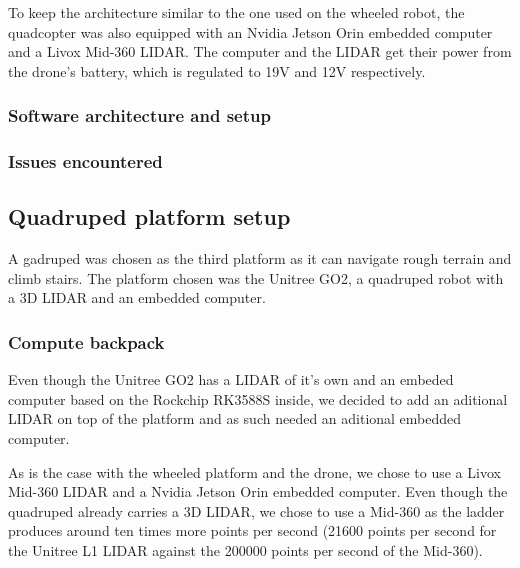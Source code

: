 \documentclass[11pt]{article}
\begin{document}
                To keep the architecture similar to the one used on the wheeled robot, the quadcopter was also equipped with an Nvidia Jetson Orin embedded computer and a Livox Mid-360 LIDAR. The computer and the LIDAR get their power from the drone's battery, which is regulated to 19V and 12V respectively.

            \subsubsection{Software architecture and setup}
                
        
            \subsubsection{Issues encountered}
            
    \subsection{Quadruped platform setup}

        A gadruped was chosen as the third platform as it can navigate rough terrain and climb stairs. The platform chosen was the Unitree GO2, a quadruped robot with a 3D LIDAR and an embedded computer.

        \subsubsection{Compute backpack}

        Even though the Unitree GO2 has a LIDAR of it's own and an embeded computer based on the Rockchip RK3588S inside, we decided to add an aditional LIDAR on top of the platform and as such needed an aditional embedded computer.

        As is the case with the wheeled platform and the drone, we chose to use a Livox Mid-360 LIDAR and a Nvidia Jetson Orin embedded computer. Even though the quadruped already carries a 3D LIDAR, we chose to use a Mid-360 as the ladder produces around ten times more points per second (21600 points per second for the Unitree L1 LIDAR against the 200000 points per second of the Mid-360).
\end{document}
